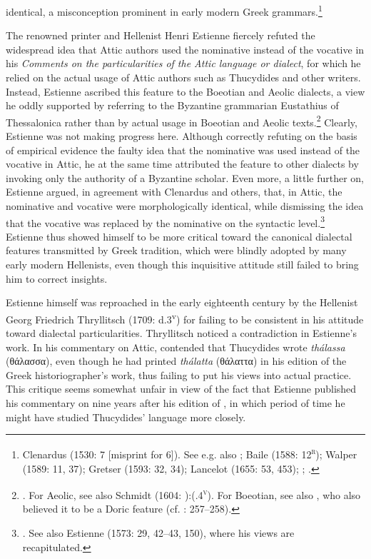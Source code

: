 identical, a misconception prominent in early modern Greek grammars.\footnote{Clenardus (1530: 7 [misprint for 6]). See e.g. also \citet[534]{Crusius1558}; Baile (1588: 12\textsc{\textsuperscript{r}}); Walper (1589: 11, 37); Gretser (1593: 32, 34); Lancelot (1655: 53, 453); \citet[101]{Giraudeau1739}; \citet[20]{Facius1782}.}

The renowned printer and Hellenist Henri Estienne fiercely refuted the widespread idea that Attic authors used the nominative instead of the vocative in his \textit{Comments on the particularities of the Attic language or dialect}, for which he relied on the actual usage of Attic authors such as Thucydides and other writers. Instead, Estienne ascribed this feature to the Boeotian and Aeolic dialects, a view he oddly supported by referring to the Byzantine grammarian Eustathius of Thessalonica rather than by actual usage in Boeotian and Aeolic texts.\footnote{\citet[15]{Estienne1573}. For Aeolic, see also Schmidt (1604: ):(.4\textsc{\textsuperscript{v}}). For Boeotian, see also \citet[71]{Mérigon1621}, who also believed it to be a Doric feature (cf. \citealt{Maittaire1706}: 257–258).} Clearly, Estienne was not making progress here. Although correctly refuting on the basis of empirical evidence the faulty idea that the nominative was used instead of the vocative in Attic, he at the same time attributed the feature to other dialects by invoking only the authority of a Byzantine scholar. Even more, a little further on, Estienne argued, in agreement with Clenardus and others, that, in Attic, the nominative and vocative were morphologically identical, while dismissing the idea that the vocative was replaced by the nominative on the syntactic level.\footnote{\citet[17]{Estienne1573}. See also Estienne (1573: 29, 42–43, 150), where his views are recapitulated.} Estienne thus showed himself to be more critical toward the canonical dialectal features transmitted by Greek tradition, which were blindly adopted by many early modern Hellenists, even though this inquisitive attitude still failed to bring him to correct insights.

Estienne himself was reproached in the early eighteenth century by the Hellenist Georg Friedrich Thryllitsch (1709: d.3\textsuperscript{v}) for failing to be consistent in his attitude toward dialectal particularities. Thryllitsch noticed a contradiction in Estienne’s work. In his commentary on Attic, \citet[13]{Estienne1573} contended that Thucydides wrote \textit{thálassa} (θάλασσα), even though he had printed \textit{thálatta} (θάλαττα) in his edition of the Greek historiographer’s work, thus failing to put his views into actual practice. This critique seems somewhat unfair in view of the fact that Estienne published his commentary on \citet{Attic1573} nine years after his edition of \citet{Thucydides1564}, in which period of time he might have studied Thucydides’ language more closely.

